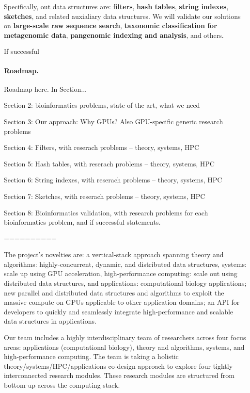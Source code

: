 Specifically, out data structures are: \textbf{filters}, \textbf{hash tables}, \textbf{string indexes}, \textbf{sketches}, and related auxialiary data structures.  We will validate our solutions on \textbf{large-scale raw sequence search}, \textbf{taxonomic classification for metagenomic data}, \textbf{pangenomic indexing and analysis}, and others.

If successful 

\paragraph{Roadmap.} Roadmap here. In Section...

Section 2: bioinformatics problems, state of the art, what we need

Section 3: Our approach: Why GPUs?  Also GPU-specific generic research problems

Section 4: Filters, with reserach problems -- theory, systems, HPC

Section 5: Hash tables, with reserach problems -- theory, systems, HPC

Section 6: String indexes, with reserach problems -- theory, systems, HPC

Section 7: Sketches, with reserach problems -- theory, systems, HPC

Section 8: Bioinformatics validation, with research problems for each bioinformatics problem, and if successful statements.

\iffalse
==========

The project’s novelties are: a vertical-stack approach spanning theory and algorithms: highly-concurrent, dynamic, and distributed data structures, systems: scale up using GPU acceleration, high-performance computing: scale out using distributed data structures, and applications: computational biology applications; new parallel and distributed data structures and algorithms to exploit the massive compute on GPUs applicable to other application domains; an API for developers to quickly and seamlessly integrate high-performance and scalable data structures in applications.

Our team includes a highly interdisciplinary team of researchers across four focus areas: applications (computational biology), theory and algorithms, systems, and high-performance computing. The team is taking a holistic theory/systems/HPC/applications co-design approach to explore four tightly interconnected research modules. These research modules are structured from bottom-up across the computing stack.


